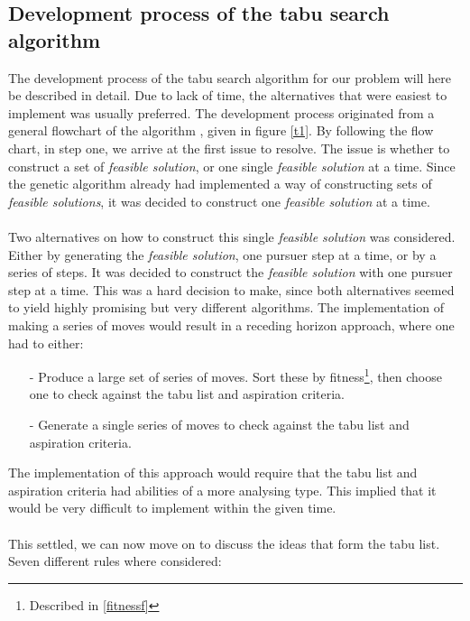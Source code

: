 \subsection{Development process of the tabu search algorithm}\label{DpT}
The development process of the tabu search algorithm for our problem will here be described in detail. Due to lack of time, the alternatives that were easiest to implement was usually preferred. The development process originated from a general flowchart of the algorithm \cite{canada} \cite{Glover2}, given in figure \ref{t1}. By following the flow chart, in step one, we arrive at the first issue to resolve. The issue is whether to construct a set of \emph{feasible solution}, or one single \emph{feasible solution} at a time. Since the genetic algorithm already had implemented a way of constructing sets of \emph{feasible solutions}, it was decided to construct one \emph{feasible solution} at a time.\\
\\
Two alternatives on how to construct this single \emph{feasible solution} was considered. Either by generating the \emph{feasible solution}, one pursuer step at a time, or by a series of steps. It was decided to construct the \emph{feasible solution} with one pursuer step at a time. This was a hard decision to make, since both alternatives seemed to yield highly promising but very different algorithms. The implementation of making a series of moves would result in a receding horizon approach, where one had to either:  
\begin{itemize}
\item[-]{}Produce a large set of series of moves. Sort these by fitness\footnote{Described in \ref{fitnessf}}, then choose one to check against the tabu list and aspiration criteria.
\item[-]{}Generate a single series of moves to check against the tabu list and aspiration criteria.
\end{itemize}
The implementation of this approach would require that the tabu list and aspiration criteria had abilities of a more analysing type. This implied that it would be very difficult to implement within the given time.\\
\\This settled, we can now move on to discuss the ideas that form the tabu list. Seven different rules where considered:
